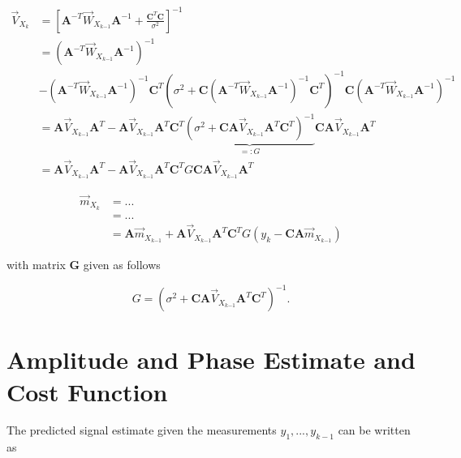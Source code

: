 \documentclass[11pt,a4paper,twoside]{report}
\newcommand{\messF}[3]{\overrightarrow{#1}_{{#2}_{k{#3}}}}
\newcommand{\mat}[1]{\mathbf{#1}}
\begin{document}
\begin{align}
	\label{eq: update rule, covariance}
	\messF{V}{X}{} &= \left[\mat{A}^{-T}\messF{W}{X}{-1}\mat{A}^{-1} + \frac{\mat{C}^T\mat{C}}{\sigma^2}\right]^{-1} \\
	\nonumber
	&= \left(\mat{A}^{-T}\messF{W}{X}{-1}\mat{A}^{-1}\right)^{-1} \\
	& - \left(\mat{A}^{-T}\messF{W}{X}{-1}\mat{A}^{-1}\right)^{-1}\mat{C}^T\left(\sigma^2 + \mat{C}\left(\mat{A}^{-T}\messF{W}{X}{-1}\mat{A}^{-1}\right)^{-1}\mat{C}^T\right)^{-1}\mat{C}\left(\mat{A}^{-T}\messF{W}{X}{-1}\mat{A}^{-1}\right)^{-1} \\
	\nonumber
	&= \mat{A}\messF{V}{X}{-1}\mat{A}^T - \mat{A}\messF{V}{X}{-1}\mat{A}^T\mat{C}^T\underbrace{\left(\sigma^2 + \mat{C}\mat{A}\messF{V}{X}{-1}\mat{A}^T\mat{C}^T\right)^{-1}}_{=:G}\mat{C}\mat{A}\messF{V}{X}{-1}\mat{A}^T \\
	&= \mat{A}\messF{V}{X}{-1}\mat{A}^T - \mat{A}\messF{V}{X}{-1}\mat{A}^T\mat{C}^TG\mat{CA}\messF{V}{X}{-1}\mat{A}^T
\end{align}

\begin{align}
	\label{eq: update rule, mean vector}
	\messF{m}{X}{} &= ... \\
	\nonumber
	&= ... \\
	&= \mat{A}\messF{m}{X}{-1} + \mat{A}\messF{V}{X}{-1}\mat{A}^T\mat{C}^TG\left(y_k-\mat{CA}\messF{m}{X}{-1}\right)
\end{align}

with matrix $\mat{G}$ given as follows

\begin{equation*}
	G = \left(\sigma^2 + \mat{CA}\messF{V}{X}{-1}\mat{A}^T\mat{C}^{T}\right)^{-1}.
\end{equation*}

%

\chapter*{Amplitude and Phase Estimate and Cost Function}
The predicted signal estimate given the measurements ${y_1,...,y_{k-1}}$ can be written as
\end{document}
